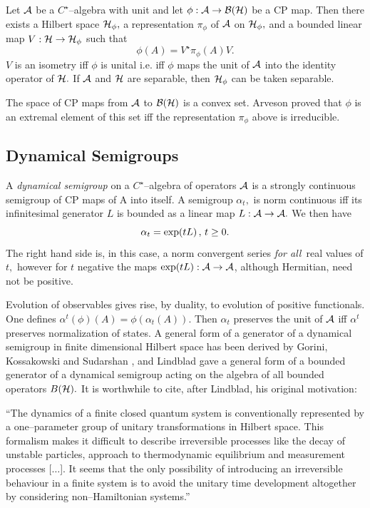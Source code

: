 \documentclass[12pt]{article}
\def\be{\begin{equation}} \def\ee{\end{equation}}
\begin{document}
\begin{theorem}
Let ${\cal A}$ be a
$C^{\star}$--algebra with unit and let $\phi : {\cal A}\rightarrow
{\cal B} ({\cal H})$ be a CP map.  Then there exists a
Hilbert space ${\cal H}_\phi , $ a representation $\pi_\phi$ of ${\cal A}$
on ${\cal H}_\phi ,  $ and a bounded linear map $V :  {\cal
H}\rightarrow {\cal H}_\phi $ such that  
\be \phi  (A) = V^{\star}\pi_\phi
 (A) V .  
\ee $V$ is an isometry iff $\phi$ is unital i.e.  iff $\phi$
maps the unit of ${\cal A}$ into the identity operator of ${\cal H}. $
If ${\cal A}$ and ${\cal H}$ are separable,  then ${\cal H}_\phi $ can
be taken separable. 
\end{theorem}
\vspace{1cm}
The space of CP maps from ${\cal A}$ to ${\cal B} ({\cal H})$
is a convex set.  Arveson \cite{arv} proved that $\phi $ is an extremal
element of this set iff the representation $\pi_\phi$ above is irreducible. 

\subsection{Dynamical Semigroups}

A {\em dynamical semigroup} on a $C^{\star }$--algebra of operators ${\cal A}$ 
is
a strongly continuous semigroup of CP maps of {\cal A} into
itself.  A semigroup $\alpha _t , $ is norm continuous 
iff its infinitesimal
generator $L$ is bounded as a linear map $L: {\cal A}\rightarrow {\cal A} . $
We then have \be
\alpha _t=\exp (t L) \thinspace , \thinspace t\geq 0 .  \ee
The right hand side is,  in this case,   a norm convergent series {\em for all}\
real values of $t, $ however for $t$ negative the maps $\exp (tL): {\cal A}
\rightarrow {\cal A}$, although Hermitian, need not be positive.

Evolution of observables
gives rise,  by duality,  to evolution of positive functionals.  One defines $
\alpha ^t (\phi ) (A)=\phi  (\alpha _t (A)). $ Then $\alpha _t$ preserves the
unit of ${\cal A}$ iff $\alpha ^t$ preserves normalization of states.  A
general form of a generator of a dynamical semigroup in finite dimensional
Hilbert space has been derived by Gorini,  Kossakowski and Sudarshan \cite
{koss},  and Lindblad \cite{lin} gave a general form of a bounded generator of
a dynamical semigroup acting on the algebra of all bounded operators $B
 ({\cal H}). $ It is worthwhile to cite, after Lindblad, his
 original motivation:

``The dynamics of a finite closed quantum system is conventionally
represented by a one--parameter group of unitary transformations in Hilbert
space.  This formalism makes it difficult to describe irreversible processes
like the decay of unstable particles,  approach to thermodynamic equilibrium
and measurement processes [$\ldots $].  It seems that the only possibility of
introducing an irreversible behaviour in a finite system is to avoid the
unitary time development altogether by considering non--Hamiltonian systems.''
\end{document}
